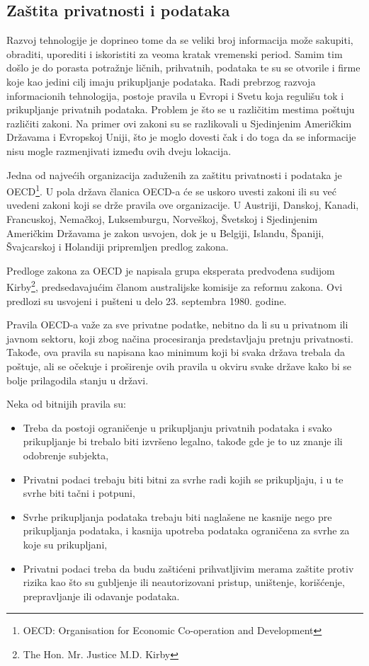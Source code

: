 \documentclass[a4paper]{article}
\begin{document}
{\subsection{Zaštita privatnosti i podataka}

Razvoj tehnologije je doprineo tome da se veliki broj informacija može sakupiti, obraditi, uporediti i iskoristiti za veoma kratak vremenski period. Samim tim došlo je do porasta potražnje ličnih, prihvatnih, podataka te su se otvorile i firme koje kao jedini cilj imaju prikupljanje podataka. Radi prebrzog razvoja informacionih tehnologija, postoje pravila u Evropi i Svetu koja regulišu tok i prikupljanje privatnih podataka. Problem je što se u različitim mestima poštuju različiti zakoni. Na primer ovi zakoni su se razlikovali u Sjedinjenim Američkim Državama i Evropskoj Uniji, što je moglo dovesti čak i do toga da se informacije nisu mogle razmenjivati između ovih dveju lokacija.

Jedna od najvećih organizacija zaduženih za zaštitu privatnosti i podataka je OECD\footnote{OECD: Organisation for Economic Co-operation and Development}. U pola država članica OECD-a će se uskoro uvesti zakoni ili su već uvedeni zakoni koji se drže pravila ove organizacije. U Austriji, Danskoj, Kanadi, Francuskoj, Nemačkoj, Luksemburgu, Norveškoj, Švetskoj i Sjedinjenim Američkim Državama je zakon usvojen, dok je u Belgiji, Islandu, Španiji, Švajcarskoj i Holandiji pripremljen predlog zakona.\cite{OECD}

Predloge zakona za OECD je napisala grupa eksperata predvođena sudijom Kirby\footnote{The Hon. Mr. Justice M.D. Kirby}, predsedavajućim članom australijske komisije za reformu zakona. Ovi predlozi su usvojeni i pušteni u delo 23. septembra 1980. godine.

Pravila OECD-a važe za sve privatne podatke, nebitno da li su u privatnom ili javnom sektoru, koji zbog načina procesiranja predstavljaju pretnju privatnosti. Takođe, ova pravila su napisana kao minimum koji bi svaka država trebala da poštuje, ali se očekuje i proširenje ovih pravila u okviru svake države kako bi se bolje prilagodila stanju u državi.

Neka od bitnijih pravila su:\cite{Property}

\begin{itemize}
	\item{Treba da postoji ograničenje u prikupljanju privatnih podataka i svako prikupljanje bi trebalo biti izvršeno legalno, takođe gde je to uz znanje ili odobrenje subjekta,}
	\item{Privatni podaci trebaju biti bitni za svrhe radi kojih se prikupljaju, i u te svrhe biti tačni i potpuni,}
	\item{Svrhe prikupljanja podataka trebaju biti naglašene ne kasnije nego pre prikupljanja podataka, i kasnija upotreba podataka ograničena za svrhe za koje su prikupljani,}
	\item{Privatni podaci treba da budu zaštićeni prihvatljivim merama zaštite protiv rizika kao što su gubljenje ili neautorizovani pristup, uništenje, korišćenje, prepravljanje ili odavanje podataka.}
\end{itemize}

}
\end{document}
